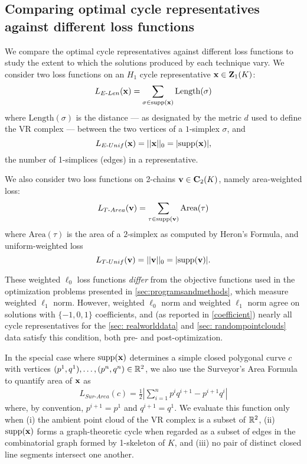   
\subsection{Comparing optimal cycle representatives against different loss functions}\label{sec:comparing optimal generators against different loss functions}

We compare the optimal cycle representatives against different loss functions to study the extent to which the solutions produced by each technique vary. We consider two loss functions on an $H_1$ cycle representative $\mathbf{x} \in \mathbf{Z}_1(K)$:
$$
L_{E\text{-}Len}(\mathbf{x}) = \sum_{\sigma \in \mathrm{supp}(\mathbf{x})} \mathrm{Length}(\sigma)
$$
where $\mathrm{Length}(\sigma)$ is the distance --- as designated by the metric $d$ used to define the VR complex --- between the two vertices of a $1$-simplex $\sigma$, and
$$
L_{E\text{-}Unif}(\mathbf{x}) = ||\mathbf{x}||_0=|\mathrm{supp}(\mathbf{x})|, 
$$ 
the number of 1-simplices (edges) in a representative. 


We also consider two loss functions on 2-chains $\mathbf{v} \in \mathbf{C}_2(K)$, namely area-weighted loss:
$$
L_{T\text{-}Area}(\mathbf{v}) = \sum_{\tau \in \mathrm{supp}(\mathbf{v})} \mathrm{Area}(\tau)$$
where $\mathrm{Area}(\tau)$ is the area of a $2$-simplex as computed by Heron's Formula, and uniform-weighted loss
$$
L_{T\text{-}Unif}(\mathbf{v}) = ||\mathbf{v}||_0 = |\mathrm{supp}( \mathbf{v})|.
$$

\begin{remark}
These weighted $\ell_0$ loss functions \emph{differ} from the objective functions used in the optimization problems presented in \se \ref{sec:programsandmethods}, which measure weighted $\ell_1$ norm.  However, weighted $\ell_0$ norm and weighted $\ell_1$ norm agree on solutions with $\{-1, 0, 1\}$ coefficients, and (as reported in \se \ref{coefficient}) nearly all cycle representatives for the \se \ref{sec: realworlddata} and \ref{sec: randompointclouds} data satisfy this condition, both pre- and post-optimization.
\end{remark}

In the special case where $\mathrm{supp}(\mathbf{x})$ determines a simple closed polygonal curve $c$ with vertices $(p^1, q^1), \ldots, (p^n, q^n) \in \mathbb{R}^2$, we also use the Surveyor's Area Formula \cite{TheSurveyorsAreaFormula}  to quantify area of $\mathbf{x}$ as  
    \begin{align*}
    \textstyle
    L_{Sur\text{-}Area}(c)
    =
    \frac{1}{2}
    \left  |
        \sum_{i=1}^{n} p^i q^{i+1} - 
        p^{i+1} q^{i}
    \right |
    \end{align*}
where, by convention, $p^{i+1} = p^1$ and $q^{i+1} =  q^1$. We evaluate this function only when (i) the ambient point cloud of the VR complex is a subset of $\mathbb{R}^2$, (ii) $\mathrm{supp}(\mathbf{x})$ forms a graph-theoretic cycle when regarded as a subset of edges in the combinatorial graph formed by 1-skeleton of $K$, and (iii) no pair of distinct closed line segments intersect one another.


